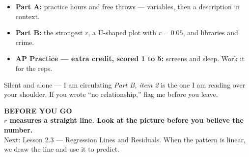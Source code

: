 \documentclass[aspectratio=169, 11pt]{beamer}
\begin{document}
\begin{frame}[t, plain]
  \begin{itemize}\setlength{\itemsep}{5pt}
    \item \textbf{Part A:} practice hours and free throws --- variables, then a description
          in context.
    \item \textbf{Part B:} the strongest $r$, a U-shaped plot with $r = 0.05$, and libraries
          and crime.
    \item \textbf{AP Practice --- extra credit, scored 1 to 5:} screens and sleep. Work it for the reps.
  \end{itemize}
  \begin{block}{Silent and alone --- I am circulating}
    \emph{Part B, item 2} is the one I am reading over your shoulder. If you wrote ``no
    relationship,'' flag me before you leave.
  \end{block}
\end{frame}

{
\begin{frame}[plain]
  \vspace{1.5cm}\hspace{0.8cm}%
  \begin{minipage}{0.86\textwidth}
    {\color{goldacc}\bfseries\small BEFORE YOU GO}\\[0.7cm]
    {\color{white}\bfseries\Large $r$ measures a straight line. Look at the picture before
    you believe the number.}\\[0.9cm]
    {\color{skymid}\small Next: Lesson 2.3 --- Regression Lines and Residuals. When the
    pattern is linear, we draw the line and use it to predict.}
  \end{minipage}
\end{frame}
}
\end{document}
